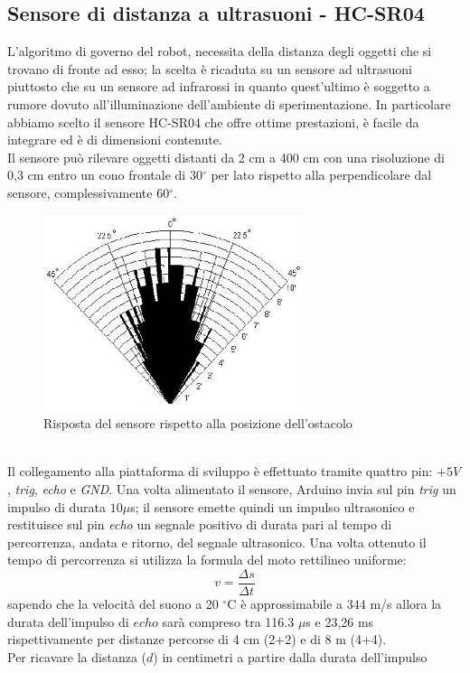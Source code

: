 \subsection{Sensore di distanza a ultrasuoni - HC-SR04}
L'algoritmo di governo del robot, necessita della distanza degli oggetti che si 
trovano di fronte ad esso; la scelta è ricaduta su un sensore 
ad ultrasuoni piuttosto che su un sensore ad infrarossi in quanto quest'ultimo è
soggetto a rumore dovuto all'illuminazione dell'ambiente di sperimentazione.
In particolare abbiamo scelto il sensore HC-SR04 che 
offre ottime prestazioni, è facile da integrare ed è di dimensioni contenute.\\
Il sensore può rilevare oggetti distanti da 2 cm a 400 cm con una risoluzione 
di 0,3 cm entro un cono frontale di 30$^\circ$ per lato 
rispetto alla perpendicolare dal sensore, complessivamente 60$^\circ$.
\begin{figure}[!htb] \center
\includegraphics[scale=0.6]{immagini/HC-SR04_Angle.png}
\caption{Risposta del sensore rispetto alla posizione dell'ostacolo} 
\end{figure}
\\Il collegamento alla piattaforma di sviluppo è effettuato tramite quattro pin: 
\textit{$+5V$}, \textit{trig}, \textit{echo} e \textit{GND}.
Una volta alimentato il sensore, Arduino invia
sul pin \textit{trig} un impulso di durata $10 \mu$s; il sensore emette 
quindi un impulso ultrasonico e restituisce sul pin \textit{echo} un segnale 
positivo di durata pari al tempo di percorrenza, andata e ritorno, del segnale 
ultrasonico. Una volta ottenuto il tempo di percorrenza si utilizza la formula 
del moto rettilineo uniforme:
$$v = \frac{\Delta s}{\Delta t}$$
sapendo che la velocità del suono a 20 $^\circ$C è approssimabile a 344 m/s allora 
la durata dell'impulso di $echo$ sarà compreso tra 116.3 $\mu$s e 23,26 ms 
rispettivamente per distanze percorse di 4 cm (2+2) e di 8 m (4+4).
\\Per ricavare la distanza ($d$) in centimetri a partire dalla durata dell'impulso 
